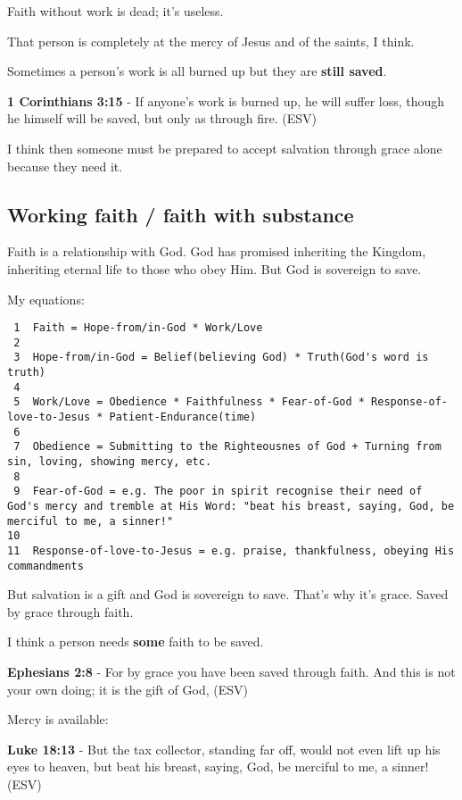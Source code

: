 \documentclass[11pt]{article}
\begin{document}
Faith without work is dead; it's useless.

That person is completely at the mercy of Jesus and of the saints, I think.

Sometimes a person's work is all burned up but they are \textbf{still saved}.

\textbf{1 Corinthians 3:15} -  If anyone's work is burned up, he will suffer loss, though he himself will be saved, but only as through fire. (ESV)

I think then someone must be prepared to accept salvation through grace alone because they need it.

\subsection{Working faith / faith with substance}
\label{sec:org7fd3a7e}

Faith is a relationship with God. God has promised inheriting the Kingdom, inheriting eternal life to those who obey Him. But God is sovereign to save.

My equations:

\begin{verbatim}
 1  Faith = Hope-from/in-God * Work/Love
 2  
 3  Hope-from/in-God = Belief(believing God) * Truth(God's word is truth)
 4  
 5  Work/Love = Obedience * Faithfulness * Fear-of-God * Response-of-love-to-Jesus * Patient-Endurance(time)
 6  
 7  Obedience = Submitting to the Righteousnes of God + Turning from sin, loving, showing mercy, etc.
 8  
 9  Fear-of-God = e.g. The poor in spirit recognise their need of God's mercy and tremble at His Word: "beat his breast, saying, God, be merciful to me, a sinner!"
10  
11  Response-of-love-to-Jesus = e.g. praise, thankfulness, obeying His commandments
\end{verbatim}

But salvation is a gift and God is sovereign to save.
That's why it's grace.
Saved by grace through faith.

I think a person needs \textbf{some} faith to be saved.

\textbf{Ephesians 2:8} -  For by grace you have been saved through faith.  And this is not your own doing; it is the gift of God,  (ESV)

Mercy is available:

\textbf{Luke 18:13} -  But the tax collector, standing far off, would not even lift up his eyes to heaven, but beat his breast, saying, God, be merciful to me, a sinner!  (ESV)
\end{document}
